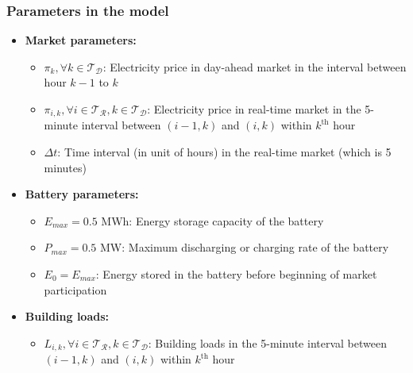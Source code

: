 \documentclass[11pt,twoside]{article}
\begin{document}
\subsubsection{Parameters in the model}
\begin{itemize}
\item\textbf{Market parameters:}
\begin{itemize}
\item[\textbullet] $\pi_{k}, \forall k \in \mathcal{T_D}$: Electricity price in day-ahead market in the interval between hour $k-1$ to $k$
\item[\textbullet] $\pi_{i,k}, \forall i \in \mathcal{T_R}, k \in \mathcal{T_D}$: Electricity price in real-time market in the 5-minute interval between $(i-1,k)$ and $(i,k)$ within $k^\text{th}$ hour
\item[\textbullet] $\Delta t$: Time interval (in unit of hours) in the real-time market (which is 5 minutes)
\end{itemize}
\item\textbf{Battery parameters:}
\begin{itemize}
\item[\textbullet] $E_{max} = 0.5$ MWh: Energy storage capacity of the battery
\item[\textbullet] $P_{max} = 0.5$ MW: Maximum discharging or charging rate of the battery
\item[\textbullet] $E_{0} = E_{max}$: Energy stored in the battery before beginning of market participation
\end{itemize}
\item\textbf{Building loads:}
\begin{itemize}
\item[\textbullet] $L_{i,k}, \forall i \in \mathcal{T_R}, k \in \mathcal{T_D}$: Building loads in the 5-minute interval between $(i-1,k)$ and $(i,k)$ within $k^\text{th}$ hour
\end{itemize}
\end{itemize}
\end{document}

